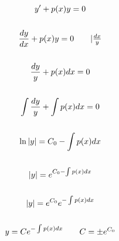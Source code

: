 \documentclass[12pt, a4paper]{article}
\begin{document}
    
    \maketitle

    \newpage
    
    \begin{gather*}
        y' + p(x)y = 0 \\ \\
        \frac{dy}{dx} + p(x)y = 0 \tag*{$| \frac{dx}{y}$} \\ \\
        \frac{dy}{y} + p(x)dx = 0 \\ \\
        \int \frac{dy}{y} + \int p(x)dx = 0 \\ \\
        \ln |y| = C_0 - \int p(x)dx \\ \\
        |y| = e^{C_0 - \int p(x)dx} \\ \\
        |y| = e^{C_0}e^{-\int p(x)dx} \\ \\
        y = Ce^{-\int p(x)dx} \tag*{$C = \pm e^{C_0}$}
    \end{gather*}
    
\end{document}
